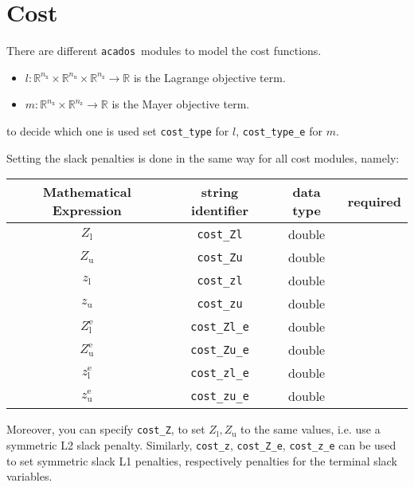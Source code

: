 \documentclass{article}
\newcommand{\code}[1]{\texttt{#1}}
\newcommand{\acados}{\texttt{acados}}
\newcommand{\ind}[1]{_{\textrm{#1}}}
\newcommand{\terminal}{^{\textrm{e}}}
\newcommand{\Lower}{\ind{l}}
\newcommand{\upper}{\ind{u}}
\newcommand{\nx}{n\ind{x}}
\newcommand{\nuu}{n\ind{u}}
\newcommand{\nz}{n\ind{z}}
\begin{document}
\section{Cost}
There are different \acados~modules to model the cost functions.
\begin{itemize}
\item $ l: \mathbb{R}^{\nx}\times\mathbb{R}^{\nuu}\times\mathbb{R}^{\nz} \rightarrow \mathbb{R}$ is the Lagrange objective term.
\item $ m: \mathbb{R}^{\nx}\times\mathbb{R}^{\nz} \rightarrow \mathbb{R} $ is the Mayer objective term.
\end{itemize}
to decide which one is used set \code{cost\_type} for $ l $, \code{cost\_type\_e} for $ m $.

Setting the slack penalties is done in the same way for all cost modules, namely:
\begin{table}[h!]
	\centering
	\begin{tabular}{|c|c|c|c|}
		\toprule
		Mathematical Expression  & string identifier & data type & required \\ \midrule
		$ Z\Lower $ & \code{cost\_Zl}    & double  & \optional \\ \midrule
		$ Z\upper $ & \code{cost\_Zu}    & double  & \optional   \\ \midrule
		$ z\Lower $ & \code{cost\_zl}    & double  & \optional   \\ \midrule
		$ z\upper $ & \code{cost\_zu}    & double  & \optional   \\ \midrule
		$ Z\Lower\terminal $ & \code{cost\_Zl\_e}    & double  & \optional   \\ \midrule
		$ Z\upper\terminal $ & \code{cost\_Zu\_e}    & double  & \optional   \\ \midrule
		$ z\Lower\terminal $ & \code{cost\_zl\_e}    & double  & \optional   \\ \midrule
		$ z\upper\terminal $ & \code{cost\_zu\_e}    & double  & \optional   \\
		\bottomrule
	\end{tabular}
\end{table}

Moreover, you can specify \texttt{cost\_Z}, to set $ Z\Lower, Z\upper $ to the same values, i.e. use a symmetric L2 slack penalty.
Similarly, \texttt{cost\_z}, \texttt{cost\_Z\_e}, \texttt{cost\_z\_e} can be used to set symmetric slack L1 penalties, respectively penalties for the terminal slack variables.
\end{document}

